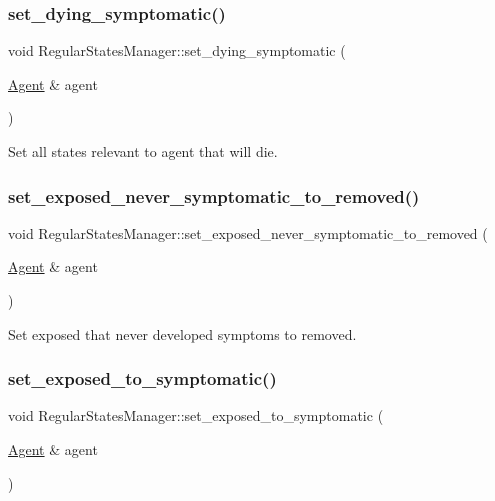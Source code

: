 \subsubsection{\texorpdfstring{set\+\_\+dying\+\_\+symptomatic()}{set\_dying\_symptomatic()}}
{\footnotesize\ttfamily void Regular\+States\+Manager\+::set\+\_\+dying\+\_\+symptomatic (\begin{DoxyParamCaption}\item[{\hyperlink{classAgent}{Agent} \&}]{agent }\end{DoxyParamCaption})}



Set all states relevant to agent that will die. 

\mbox{\label{classRegularStatesManager_a1378bb9ee86f261d5bf7c66c7798e1b4}} 
\subsubsection{\texorpdfstring{set\+\_\+exposed\+\_\+never\+\_\+symptomatic\+\_\+to\+\_\+removed()}{set\_exposed\_never\_symptomatic\_to\_removed()}}
{\footnotesize\ttfamily void Regular\+States\+Manager\+::set\+\_\+exposed\+\_\+never\+\_\+symptomatic\+\_\+to\+\_\+removed (\begin{DoxyParamCaption}\item[{\hyperlink{classAgent}{Agent} \&}]{agent }\end{DoxyParamCaption})}



Set exposed that never developed symptoms to removed. 

\mbox{\label{classRegularStatesManager_a943fe599632b05929f56353471423955}} 
\subsubsection{\texorpdfstring{set\+\_\+exposed\+\_\+to\+\_\+symptomatic()}{set\_exposed\_to\_symptomatic()}}
{\footnotesize\ttfamily void Regular\+States\+Manager\+::set\+\_\+exposed\+\_\+to\+\_\+symptomatic (\begin{DoxyParamCaption}\item[{\hyperlink{classAgent}{Agent} \&}]{agent }\end{DoxyParamCaption})}



